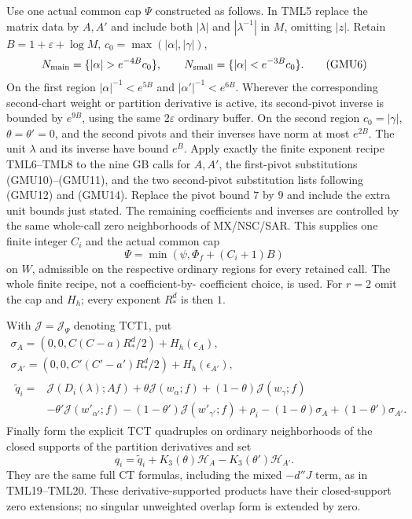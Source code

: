 Use one actual common cap $\Psi$ constructed as follows.  In TML5
replace the matrix data by $A,A'$ and include both $|\lambda|$ and
$|\lambda^{-1}|$ in $M$, omitting $|z|$.  Retain
$B=1+\varepsilon+\log M$, $c_0=\max(|\alpha|,|\gamma|)$,
\[
 N_{\rm main}=\{|\alpha|>e^{-4B}c_0\},\qquad
 N_{\rm small}=\{|\alpha|<e^{-3B}c_0\}.
 \tag{GMU6}
\]
On the first region $|\alpha|^{-1}<e^{5B}$ and
$|\alpha'|^{-1}<e^{6B}$.  Wherever the corresponding second-chart
weight or partition derivative is active, its second-pivot inverse
is bounded by $e^{9B}$, using the same $2\varepsilon$ ordinary
buffer.  On the second region $c_0=|\gamma|$,
$\theta=\theta'=0$, and the second pivots and their inverses have
norm at most $e^{2B}$.  The unit $\lambda$ and its inverse have
bound $e^B$.  Apply exactly the finite exponent recipe TML6--TML8
to the nine GB calls for $A,A'$, the first-pivot substitutions
(GMU10)--(GMU11), and the two second-pivot substitution lists
following (GMU12) and (GMU14).  Replace the pivot bound $7$ by $9$ and
include the extra unit bounds just stated.  The remaining
coefficients and inverses are controlled by the same whole-call
zero neighborhoods of MX/NSC/SAR.  This supplies one finite integer
$C_i$ and the actual common cap
\[
       \Psi=\min(\psi,\Phi_f+(C_i+1)B)
 \tag{GMU7}
\]
on $W$, admissible on the respective ordinary regions for every
retained call.  The whole finite recipe, not a coefficient-by-
coefficient choice, is used.  For $r=2$ omit the cap and $H_h$;
every exponent $R_*^d$ is then $1$.

With $\mathcal J=\mathcal J_\Psi$ denoting TCT1, put
\[
 \begin{gathered}
 \sigma_A=(0,0,C(C-a)R_*^d/2)+H_h(\epsilon_A),\\
 \sigma_{A'}=(0,0,C'(C'-a')R_*^d/2)+H_h(\epsilon_{A'}),\\
 \begin{split}
 \widetilde q_i={}&\mathcal J(D_i(\lambda);Af)
       +\theta\mathcal J(w_\alpha;f)
       +(1-\theta)\mathcal J(w_\gamma;f)\\
 &-\theta'\mathcal J(w'_{\alpha'};f)
       -(1-\theta')\mathcal J(w'_{\gamma'};f)
       +\rho_i-(1-\theta)\sigma_A+(1-\theta')\sigma_{A'}.
 \end{split}
 \end{gathered}
 \tag{GMU8}
\]
Finally form the explicit TCT quadruples on ordinary neighborhoods
of the closed supports of the partition derivatives and set
\[
       q_i=\widetilde q_i
              +K_3(\theta)\mathcal H_A
              -K_3(\theta')\mathcal H_{A'}.
 \tag{GMU9}
\]
They are the same full CT formulas, including the mixed
$-d''J$ term, as in TML19--TML20.  These derivative-supported
products have their closed-support zero extensions; no singular
unweighted overlap form is extended by zero.

